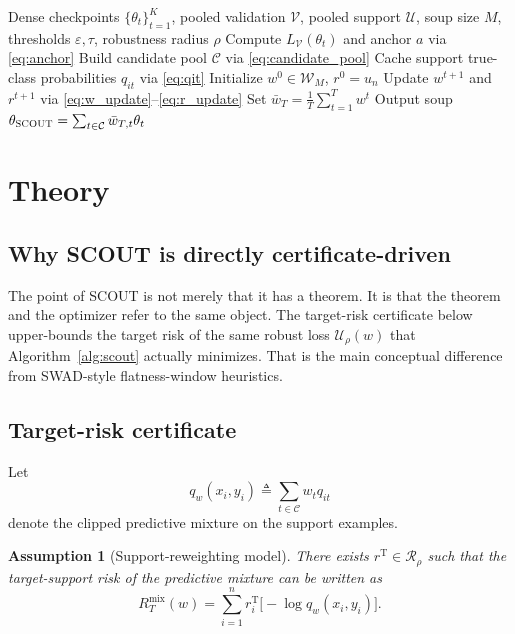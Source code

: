 \documentclass{article}
\newtheorem{assumption}{Assumption}
\newcommand{\cC}{\mathcal{C}}
\newcommand{\cR}{\mathcal{R}}
\newcommand{\cU}{\mathcal{U}}
\newcommand{\cV}{\mathcal{V}}
\newcommand{\cW}{\mathcal{W}}
\newcommand{\scout}{\textup{\textsc{SCOUT}}}
\newcommand{\swad}{\textup{\textsc{SWAD}}}
\newcommand{\eps}{\varepsilon}
\begin{document}
\begin{algorithm}[t]
    \caption{\scout{}}
    \label{alg:scout}
    \begin{algorithmic}[1]
        \Require Dense checkpoints \(\{\theta_t\}_{t=1}^K\), pooled validation \(\cV\), pooled support \(\cU\), soup size \(M\), thresholds \(\eps,\tau\), robustness radius \(\rho\)
        \State Compute \(L_{\cV}(\theta_t)\) and anchor \(a\) via \eqref{eq:anchor}
        \State Build candidate pool \(\cC\) via \eqref{eq:candidate_pool}
        \State Cache support true-class probabilities \(q_{it}\) via \eqref{eq:qit}
        \State Initialize \(w^0\in\cW_M\), \(r^0=u_n\)
            \State Update \(w^{t+1}\) and \(r^{t+1}\) via \eqref{eq:w_update}--\eqref{eq:r_update}
        \EndFor
        \State Set \(\bar w_T = \frac{1}{T}\sum_{t=1}^{T} w^t\)
        \State Output soup \(\theta_{\scout} = \sum_{t\in\cC} \bar w_{T,t}\theta_t\)
    \end{algorithmic}
\end{algorithm}

\section{Theory}
\label{sec:theory}

\subsection{Why \scout{} is directly certificate-driven}

The point of \scout{} is not merely that it has a theorem. It is that the theorem and the optimizer refer to the same object. The target-risk certificate below upper-bounds the target risk of the same robust loss \(\mathcal{U}_\rho(w)\) that Algorithm~\ref{alg:scout} actually minimizes. That is the main conceptual difference from \swad{}-style flatness-window heuristics.

\subsection{Target-risk certificate}

Let
\[
    q_w(x_i,y_i)
    \triangleq
    \sum_{t\in\cC} w_t q_{it}
\]
denote the clipped predictive mixture on the support examples.

\begin{assumption}[Support-reweighting model]
\label{ass:reweight}
There exists \(r^{\mathrm{T}}\in\cR_\rho\) such that the target-support risk of the predictive mixture can be written as
\begin{equation}
    R_T^{\mathrm{mix}}(w)
    =
    \sum_{i=1}^{n} r_i^{\mathrm{T}}
    \Big[
        -\log q_w(x_i,y_i)
    \Big].
    \label{eq:target_reweight}
\end{equation}
\end{assumption}
\end{document}

